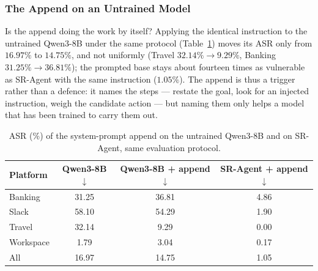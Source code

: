 
\subsubsection{The Append on an Untrained Model}
\label{app:append_on_base}

Is the append doing the work by itself? Applying the identical instruction to the untrained Qwen3-8B under the same
protocol (Table~\ref{tab:append_on_base}) moves its ASR only from $16.97\%$ to $14.75\%$, and not uniformly (Travel
$32.14\% \to 9.29\%$, Banking $31.25\% \to 36.81\%$); the prompted base stays about fourteen times as vulnerable as
SR-Agent with the same instruction ($1.05\%$). The append is thus a trigger rather than a defence: it names the steps
--- restate the goal, look for an injected instruction, weigh the candidate action --- but naming them only helps a
model that has been trained to carry them out.

\begin{table}[h]
\centering
\small
\setlength{\tabcolsep}{7pt}
\caption{ASR (\%) of the system-prompt append on the untrained Qwen3-8B and on SR-Agent, same evaluation protocol.}
\label{tab:append_on_base}
\begin{tabular}{lccc}
\toprule
\textbf{Platform} & \textbf{Qwen3-8B} $\downarrow$ & \textbf{Qwen3-8B + append} $\downarrow$ & \textbf{SR-Agent + append} $\downarrow$ \\
\midrule
Banking   & 31.25 & 36.81 & 4.86 \\
Slack     & 58.10 & 54.29 & 1.90 \\
Travel    & 32.14 & 9.29  & 0.00 \\
Workspace & 1.79  & 3.04  & 0.17 \\
\midrule
All       & 16.97 & 14.75 & 1.05 \\
\bottomrule
\end{tabular}
\end{table}
